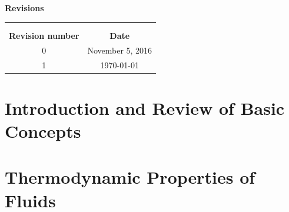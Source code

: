 \documentclass[11pts,a4paper,amsmath,amssymb,floatfix]{book}
\makeatletter
\theoremstyle{definition}
\newcommand{\blue}{\textcolor{blue}}
\newcounter{mcounter}
\newcounter{examplecounter}
\newcounter{problemcounter}
\def\etocarticlestyle{%
    \etocsettocstyle
    {\section *{\contentsname
         }
         }
    {}}
\newcommand{\extraPartText}[1]{\def\@extraPartText{#1}}
\makeatother
\begin{document}

\begin{center}
  \Large{ \bf Revisions}

\bigskip

\begin{tabular}{ c c}
\hline
                         &                    \\
                         &                    \\
{\bf Revision number}    & {\bf Date }        \\
\hline
  0                      & November 5, 2016   \\
  1                      & \today             \\
\hline 
\end{tabular}
\end{center}

\setcounter{page}{1}

\tableofcontents
\vfill
\etocarticlestyle

\pagebreak
\listoftables
\vfill
\pagebreak
\listoffigures
\vfill
\pagebreak

\makeatletter\@openrightfalse
\extraPartText{\blue{(Contents of this Part are not examinable. They were designed to help with some of the notations and definitions used in the remaining of this Notes.)}}
\part{Introduction and Review of Basic Concepts}
     \setcounter{examplecounter}{0}
     \setcounter{examplecounter}{0}
     \setcounter{examplecounter}{0}

\part{Thermodynamic Properties of Fluids}  
     \setcounter{examplecounter}{0} 
     \setcounter{problemcounter}{0}
     \setcounter{examplecounter}{0}
     \setcounter{problemcounter}{0}
\end{document}
